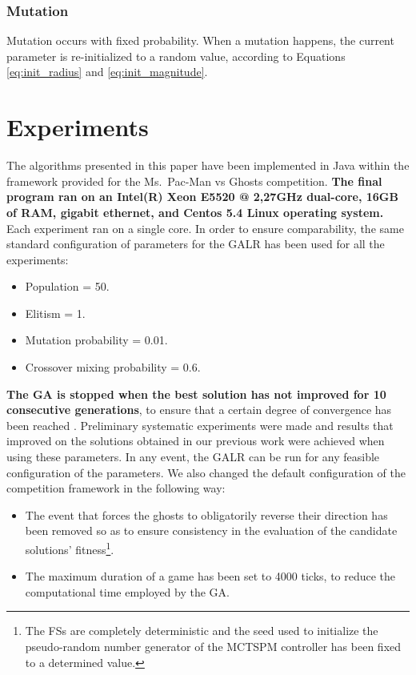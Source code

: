 \documentclass[journal]{IEEEtran}
\begin{document}
\subsubsection{Mutation}
Mutation occurs with fixed probability. When a mutation happens, the current parameter is re-initialized to a random value, according to Equations \eqref{eq:init_radius} and \eqref{eq:init_magnitude}.

\section{Experiments}
\label{sec:Experiments}
The algorithms presented in this paper have been implemented in Java within the framework provided for the Ms.\  Pac-Man vs Ghosts competition. \textbf{The final program ran on an Intel(R) Xeon E5520 @ 2,27GHz dual-core, 16GB of RAM, gigabit ethernet, and Centos 5.4 Linux operating system.} Each experiment ran on a single core. In order to ensure comparability, the same standard configuration of parameters for the GALR has been used for all the experiments:

\begin{itemize}
  \item Population = 50.
  \item Elitism = 1.
  \item Mutation probability = 0.01.
  \item Crossover mixing probability = 0.6.
\end{itemize}

\textbf{The GA is stopped when the best solution has not improved for 10 consecutive generations}, to ensure that a certain degree of convergence has been reached \cite{Karma2003, Safe2004}. Preliminary systematic experiments were made and results that improved on the solutions obtained in our previous work \cite{Liberatore2014} were achieved when using these parameters. In any event, the GALR can be run for any feasible configuration of the parameters.  We also changed the default configuration of the competition framework in the following way:

\begin{itemize}
  \item The event that forces the ghosts to obligatorily reverse their direction has been removed so as to ensure consistency in the evaluation of the candidate solutions' fitness\footnote{The FSs are completely deterministic and the seed used to initialize the pseudo-random number generator of the MCTSPM controller has been fixed to a determined value.}.
  \item The maximum duration of a game has been set to 4000 ticks, to reduce the computational time employed by the GA.
\end{itemize}
\end{document}
